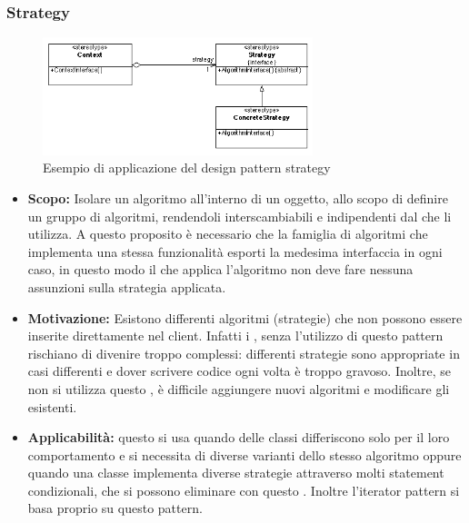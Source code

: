 \documentclass{scalatekids-article}
\begin{document}
\subsubsection{Strategy}
\begin{figure}[H]
	\begin{center}
		\includegraphics[width=0.7\textwidth, keepaspectratio]{img/designPattern/StrategyPattern.png}
		\caption{Esempio di applicazione del design pattern strategy}
	\end{center}
\end{figure}
\begin{itemize}
\item \textbf{Scopo:} Isolare un algoritmo all'interno di un oggetto, allo scopo di definire un gruppo di algoritmi, rendendoli
interscambiabili e indipendenti dal  che li utilizza. A questo proposito è necessario che la famiglia di algoritmi che implementa una stessa funzionalità esporti la medesima interfaccia in ogni caso, in questo modo il  che applica l'algoritmo non deve fare nessuna assunzioni sulla strategia applicata.
\item \textbf{Motivazione:} Esistono differenti algoritmi (strategie) che non possono essere inserite direttamente nel client. Infatti i , senza l'utilizzo di questo pattern rischiano di divenire troppo complessi: differenti strategie sono appropriate in casi differenti e dover scrivere codice ogni volta è troppo gravoso. Inoltre, se non si utilizza questo , è difficile aggiungere nuovi algoritmi e modificare gli esistenti.
\item \textbf{Applicabilità:} questo  si usa quando delle classi differiscono solo per il loro comportamento e si necessita di diverse varianti dello stesso algoritmo oppure quando una classe implementa diverse strategie attraverso molti statement condizionali, che si possono eliminare con questo . Inoltre l'iterator pattern si basa proprio su questo pattern.
\end{itemize}
\newpage
\listoftables
\newpage
\listoffigures
\end{document}
